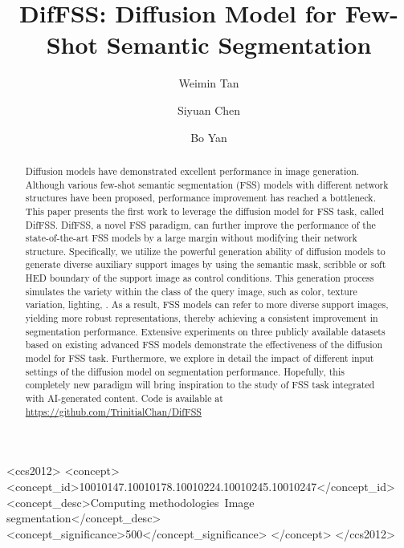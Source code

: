 \documentclass[sigconf]{acmart}
\begin{document}
\title{DifFSS: Diffusion Model for Few-Shot Semantic Segmentation}





\author{Weimin Tan}

\author{Siyuan Chen}

\author{Bo Yan}
\renewcommand{\shortauthors}{Siyuan, et al.}

\begin{abstract}
Diffusion models have demonstrated excellent performance in image generation. Although various few-shot semantic segmentation (FSS) models with different network structures have been proposed, performance improvement has reached a bottleneck. This paper presents the first work to leverage the diffusion model for FSS task, called DifFSS. DifFSS, a novel FSS paradigm, can further improve the performance of the state-of-the-art FSS models by a large margin without modifying their network structure. Specifically, we utilize the powerful generation ability of diffusion models to generate diverse auxiliary support images by using the semantic mask, scribble or soft HED boundary of the support image as control conditions. This generation process simulates the variety within the class of the query image, such as color, texture variation, lighting, . As a result, FSS models can refer to more diverse support images, yielding more robust representations, thereby achieving a consistent improvement in segmentation performance. Extensive experiments on three publicly available datasets based on existing advanced FSS models demonstrate the effectiveness of the diffusion model for FSS task. Furthermore, we explore in detail the impact of different input settings of the diffusion model on segmentation performance. Hopefully, this completely new paradigm will bring inspiration to the study of FSS task integrated with AI-generated content. Code is available at \url{https://github.com/TrinitialChan/DifFSS}
\end{abstract}



\begin{CCSXML}
<ccs2012>
   <concept>
       <concept_id>10010147.10010178.10010224.10010245.10010247</concept_id>
       <concept_desc>Computing methodologies~Image segmentation</concept_desc>
       <concept_significance>500</concept_significance>
       </concept>
 </ccs2012>
\end{CCSXML}
\end{document}
